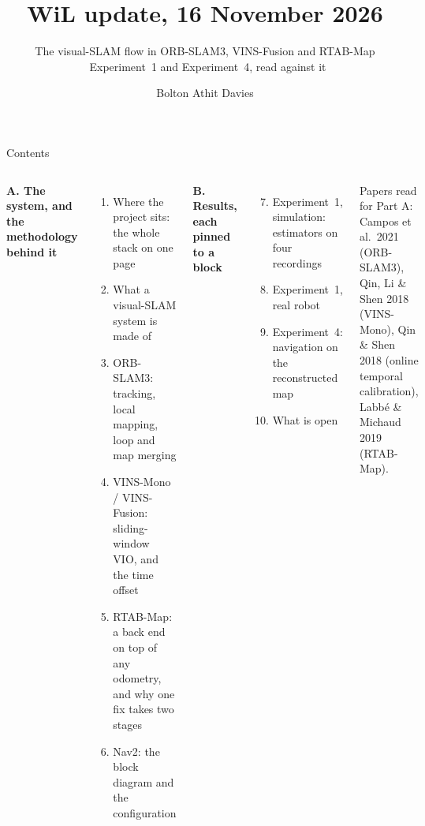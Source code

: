 \documentclass[11pt,aspectratio=169]{beamer}
\title{WiL update, 16 November 2026}
\subtitle{The visual-SLAM flow in ORB-SLAM3, VINS-Fusion and RTAB-Map
  \textperiodcentered\ Experiment~1 and Experiment~4, read against it}
\author{Bolton Athit Davies}
\date{}
\begin{document}
\begin{frame}
  \titlepage
\end{frame}

\begin{frame}{Contents}
  \begin{columns}[T]
      \textbf{A. The system, and the methodology behind it}
      \begin{enumerate}
        \item Where the project sits: the whole stack on one page
        \item What a visual-SLAM system is made of
        \item ORB-SLAM3: tracking, local mapping, loop and map merging
        \item VINS-Mono / VINS-Fusion: sliding-window VIO, and the time offset
        \item RTAB-Map: a back end on top of any odometry, and why one fix
              takes two stages
        \item Nav2: the block diagram and the configuration
      \end{enumerate}
      \textbf{B. Results, each pinned to a block}
      \begin{enumerate}
        \setcounter{enumi}{6}
        \item Experiment~1, simulation: estimators on four recordings
        \item Experiment~1, real robot
        \item Experiment~4: navigation on the reconstructed map
        \item What is open
      \end{enumerate}
      \vspace{1em}
      \footnotesize Papers read for Part A: Campos et al.\ 2021 (ORB-SLAM3),
      Qin, Li \& Shen 2018 (VINS-Mono), Qin \& Shen 2018 (online temporal
      calibration), Labbé \& Michaud 2019 (RTAB-Map).
  \end{columns}
\end{frame}

\end{document}
